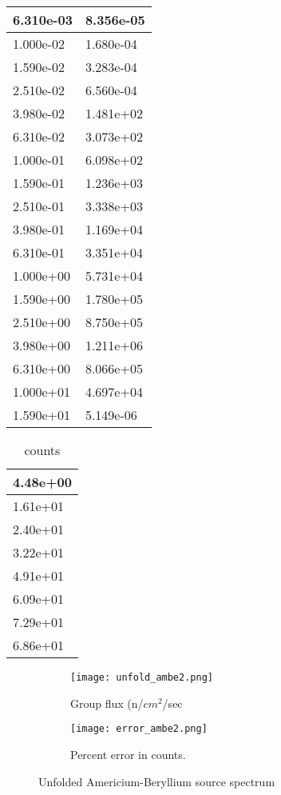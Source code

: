 \documentclass[review]{elsarticle}
\begin{document}
\begin{table}[h]
\begin{tabular}{|l|l|}
		6.310e-03&8.356e-05\\ \hline 
		1.000e-02&1.680e-04\\ \hline 
		1.590e-02&3.283e-04\\ \hline 
		2.510e-02&6.560e-04\\ \hline 
		3.980e-02&1.481e+02\\ \hline 
		6.310e-02&3.073e+02\\ \hline 
		1.000e-01&6.098e+02\\ \hline 
		1.590e-01&1.236e+03\\ \hline 
		2.510e-01&3.338e+03\\ \hline 
		3.980e-01&1.169e+04\\ \hline 
		6.310e-01&3.351e+04\\ \hline 
		1.000e+00&5.731e+04\\ \hline 
		1.590e+00&1.780e+05\\ \hline 
		2.510e+00&8.750e+05\\ \hline 
		3.980e+00&1.211e+06\\ \hline 
		6.310e+00&8.066e+05\\ \hline 
		1.000e+01&4.697e+04\\ \hline 
		1.590e+01&5.149e-06\\ \hline 
	\end{tabular}
\end{table}


\begin{table}[h]
	\caption{ counts}
	\label{tab:my-table}
	\begin{tabular}{|l|}
		\hline 
		4.48e+00\\ \hline 
		1.61e+01\\ \hline 
		2.40e+01\\ \hline 
		3.22e+01\\ \hline 
		4.91e+01\\ \hline 
		6.09e+01\\ \hline 
		7.29e+01\\ \hline 
		6.86e+01\\ \hline 
	\end{tabular}
\end{table}



\begin{figure}[h!]
	\centering
	\begin{subfigure}[b]{0.8\linewidth}
		\texttt{[image: unfold\_ambe2.png]}
		\caption{Group flux (n/$cm^2$/sec}
	\end{subfigure}
	\begin{subfigure}[b]{0.8\linewidth}
		\texttt{[image: error\_ambe2.png]}
		\caption{Percent error in counts.}
	\end{subfigure}
	\caption{Unfolded Americium-Beryllium source spectrum}
	\label{fig:ambe}
\end{figure}
\end{document}
